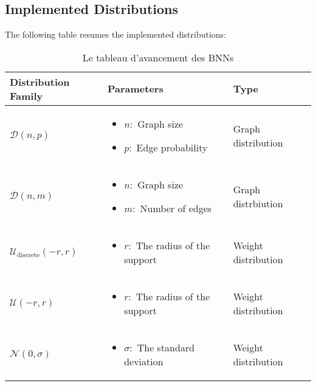 \subsection{Implemented Distributions}
The following table resumes the implemented distributions:
\begin{table}[h]
	\small
	\begin{tabularx}{\textwidth}{| X | X | X |}
		\hline
		
		Distribution Family & Parameters & Type  \\
		\hline
		$\mathcal{D}(n,p)$ & \vspace{-5mm}
		\begin{itemize}
			  \setlength\itemsep{0em}
			\item $n:$ Graph size
			\item $p:$ Edge probability
		\end{itemize} & Graph distribution \\
		\hline
		$\mathcal{D}(n,m)$ & 
		\vspace{-5mm}
		\begin{itemize}
			  \setlength\itemsep{0em}
			\item $n:$ Graph size
			\item $m:$ Number of edges
		\end{itemize} & Graph distrbiution  \\
		\hline
		$\mathcal{U}_{\text{discrete}}(-r,r)$ &
		\vspace{-5mm}
		\begin{itemize}
			  \setlength\itemsep{0em}
			\item $r:$ The radius of the support
		\end{itemize}
		 &  Weight distribution\\
		\hline
		$\mathcal{U}(-r,r)$ &\vspace{-5mm}
		\begin{itemize}
			  \setlength\itemsep{0em}
			\item $r:$ The radius of the support
		\end{itemize} & Weight distribution \\
		\hline
		$\mathcal{N}(0,\sigma)$ &
		\vspace{-5mm}
		\begin{itemize}
			  \setlength\itemsep{0em}
			\item $\sigma:$ The standard deviation
		\end{itemize} & Weight distribution\\ 
		\hline 
		
	\end{tabularx}
	\caption{Le tableau d'avancement des BNNs}
\end{table}
\FloatBarrier


